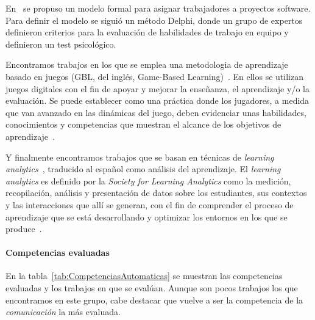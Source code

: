 En~\cite{andre2011formal} se propuso un modelo formal para asignar trabajadores a proyectos software. Para definir el modelo se siguió un método Delphi, donde un grupo de expertos definieron criterios para la evaluación de habilidades de trabajo en equipo y definieron un test psicológico.

Encontramos trabajos en los que se emplea una metodologia de aprendizaje basado en juegos (GBL, del inglés, Game-Based Learning)~\cite{bedek2011behavioral,guenaga2013serious}. En ellos se utilizan juegos digitales con el fin de apoyar y mejorar la enseñanza, el aprendizaje y/o la evaluación. Se puede establecer como una práctica donde los jugadores, a medida que van avanzado en las dinámicas del juego, deben evidenciar unas habilidades, conocimientos y competencias que muestran el alcance de los objetivos de aprendizaje~\cite{charlier2012not}.

Y finalmente encontramos trabajos que se basan en técnicas de \emph{learning analytics}~\cite{fidalgo:2015,rayon2014web}, traducido al español como análisis del aprendizaje. El \emph{learning analytics} es definido por la \emph{Society for Learning Analytics} como la medición, recopilación, análisis y presentación de datos sobre los estudiantes, sus contextos y las interacciones que allí se generan, con el fin de comprender el proceso de aprendizaje que se está desarrollando y optimizar los entornos en los que se produce~\cite{siemens2012learning}.

\paragraph*{Competencias evaluadas}
 En la tabla~\ref{tab:CompetenciasAutomaticas} se muestran las competencias evaluadas y los trabajos en que se evalúan. Aunque son pocos trabajos los que encontramos en este grupo, cabe destacar que vuelve a ser la competencia de la \emph{comunicación} la más evaluada.

